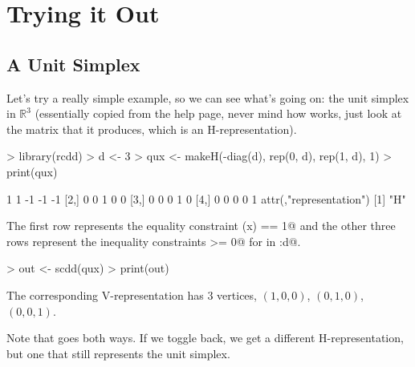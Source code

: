 \documentclass{article}
\newcommand{\real}{\mathbb{R}}
\begin{document}
\section{Trying it Out}

\subsection{A Unit Simplex}

Let's try a really simple example, so we can see what's going on:
the unit simplex in $\real^3$ (essentially copied from the \verb@scdd@
help page, never mind how \verb@makeH@ works, just look at the matrix
\verb@qux@ that it produces, which is an H-representation).
\begin{Schunk}
\begin{Sinput}
> library(rcdd)
> d <- 3
> qux <- makeH(-diag(d), rep(0, d), rep(1, d), 1)
> print(qux)
\end{Sinput}
\begin{Soutput}
     [,1] [,2] [,3] [,4] [,5]
[1,]    1    1   -1   -1   -1
[2,]    0    0    1    0    0
[3,]    0    0    0    1    0
[4,]    0    0    0    0    1
attr(,"representation")
[1] "H"
\end{Soutput}
\end{Schunk}
The first row represents the equality constraint \verb@sum(x) == 1@
and the other three rows represent the inequality constraints \verb@x[i] >= 0@
for \verb@i@ in :d@.
\begin{Schunk}
\begin{Sinput}
> out <- scdd(qux)
> print(out)
\end{Sinput}
\end{Schunk}
The corresponding V-representation has 3 vertices,
$(1, 0, 0)$, $(0, 1, 0)$, $(0, 0, 1)$.
\begin{Schunk}
\end{Schunk}
Note that \verb@scdd@ goes both ways.  If we toggle back,
we get a different H-representation, but one that still
represents the unit simplex.
\end{document}
